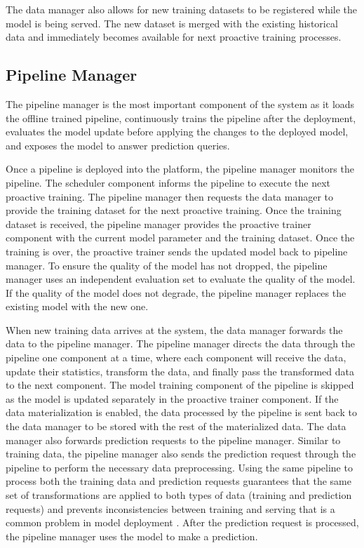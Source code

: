 The data manager also allows for new training datasets to be registered while the model is being served.
The new dataset is merged with the existing historical data and immediately becomes available for next proactive training processes.

\subsection{Pipeline Manager} \label{pipeline-manager} 
The pipeline manager is the most important component of the system as it loads the offline trained pipeline, continuously trains the pipeline after the deployment, evaluates the model update before applying the changes to the deployed model, and exposes the model to answer prediction queries.

Once a pipeline is deployed into the platform, the pipeline manager monitors the pipeline.
The scheduler component informs the pipeline to execute the next proactive training.
The pipeline manager then requests the data manager to provide the training dataset for the next proactive training.
Once the training dataset is received, the pipeline manager provides the proactive trainer component with the current model parameter and the training dataset.
Once the training is over, the proactive trainer sends the updated model back to pipeline manager.
To ensure the quality of the model has not dropped, the pipeline manager uses an independent evaluation set to evaluate the quality of the model.
If the quality of the model does not degrade, the pipeline manager replaces the existing model with the new one.

When new training data arrives at the system, the data manager forwards the data to the pipeline manager. 
The pipeline manager directs the data through the pipeline one component at a time, where each component will receive the data, update their statistics, transform the data, and finally pass the transformed data to the next component.
The model training component of the pipeline is skipped as the model is updated separately in the proactive trainer component.
If the data materialization is enabled, the data processed by the pipeline is sent back to the data manager to be stored with the rest of the materialized data.
The data manager also forwards prediction requests to the pipeline manager.
Similar to training data, the pipeline manager also sends the prediction request through the pipeline to perform the necessary data preprocessing.
Using the same pipeline to process both the training data and prediction requests guarantees that the same set of transformations are applied to both types of data (training and prediction requests) and prevents inconsistencies between training and serving that is a common problem in model deployment \cite{baylor2017tfx}.
After the prediction request is processed, the pipeline manager uses the model to make a prediction.


